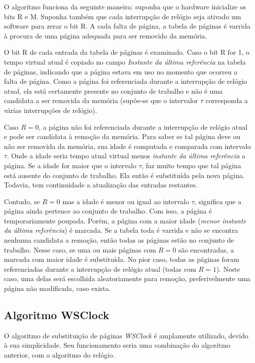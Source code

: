 O algoritmo funciona da seguinte maneira: suponha que o hardware inicialize os bits R e M. Suponha também que cada interrupção de relógio seja ativado um software para zerar o bit R. A cada falta de página, a tabela de páginas é varrida à procura de uma página adequada para ser removido da memória.

O bit R de cada entrada da tabela de páginas é examinado. Caso o bit R for 1, o tempo virtual atual é copiado no campo \textit{Instante da última referência} na tabela de páginas, indicando que a página estava em uso no momento que ocorreu a falta de página. Como a página foi referenciada durante a interrupção de relógio atual, ela está certamente presente no conjunto de trabalho e não é uma candidata a ser removida da memória (supõe-se que o intervalor $\tau$ corresponda a várias interrupções de relógio).

Caso $R = 0$, a página não foi referenciada durante a interrupção de relógio atual e pode ser candidata à remoção da memória. Para saber se tal página deve ou não ser removida da memória, sua idade é computada e comparada com intervalo $\tau$. Onde a idade seria
tempo atual virtual menos \textit{instante da última referência} a página. Se a idade for maior que o intervalo $\tau$, faz muito tempo que tal página está ausente do conjunto de trabalho. Ela então é substituída pela nova página. Todavia, tem continuidade a atualização das entradas restantes.

Contudo, se $R = 0$ mas a idade é menor ou igual ao  intervalo $\tau$, significa que a página ainda pertence ao conjunto de trabalho. Com isso, a página é temporariamente poupada. Porém, a página com a maior idade (\textit{menor instante da última referência}) é marcada. Se a tabela toda é varrida e não se encontra nenhuma candidata a remoção, então todas as páginas estão no conjunto de trabalho. Nesse caso, se uma ou mais páginas com $R = 0$ são encontradas, a marcada com maior idade é substituída. No pior caso, todas as páginas foram referenciadas durante a interrupção de relógio atual (todas com $R = 1$). Neste caso, uma delas será escolhida aleatoriamente para remoção, preferivelmente uma página não modificada, caso exista.

\subsection{Algoritmo WSClock}

O algoritmo de substituição de páginas \textit{WSClock} é amplamente utilizado, devido à sua simplicidade. Seu funcionamento seria uma combinação do algoritmo anterior, com o algoritmo do relógio.

